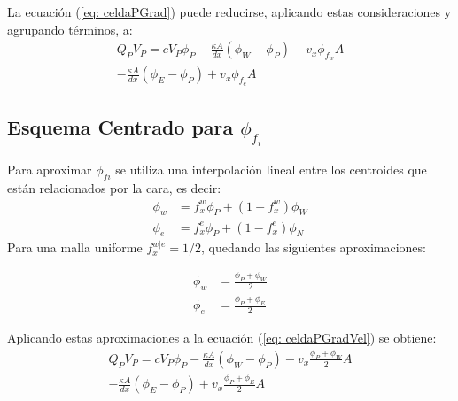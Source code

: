 \documentclass{article}
\begin{document}
    La ecuación (\ref{eq: celdaPGrad}) puede reducirse, aplicando estas consideraciones y agrupando términos, a:
    \begin{multline}
    	    Q_P V_P = c  V_P \phi_P - \frac{\kappa A}{dx} \left( \phi_W - \phi_P \right) - v_x \phi_{f_w} A \\
    	        - \frac{\kappa A}{dx} \left( \phi_E - \phi_P \right) + v_x \phi_{f_e} A
            \label{eq: celdaPGradVel}
    \end{multline}
    
            \subsection{Esquema Centrado para $\phi_{f_i}$} 
            
            Para aproximar $\phi_{fi}$ se utiliza una interpolación lineal entre los centroides que están relacionados por la cara, es decir:
            \begin{equation*}
                \begin{aligned}
                    \phi_w &= f_x^w \phi_P + (1 - f_x^w) \phi_W \\
                    \phi_e &= f_x^e \phi_P + (1 - f_x^e) \phi_N 
                \end{aligned}      
            \end{equation*} 
            Para una malla uniforme $f_x^{w|e} = 1/2$, quedando las siguientes aproximaciones:
            
            \begin{equation*}
                \begin{aligned}
                    \phi_w &= \frac{\phi_P +  \phi_W}{2} \\
                    \phi_e &= \frac{\phi_P +  \phi_E}{2}
            	\end{aligned}      
            \end{equation*}
            
            Aplicando estas aproximaciones a la ecuación (\ref{eq: celdaPGradVel}) se obtiene:
        \begin{multline}
    	    Q_P V_P = c  V_P \phi_P - \frac{\kappa A}{dx} \left( \phi_W - \phi_P \right) - v_x \frac{\phi_P +  \phi_W}{2} A \\ 
    	        - \frac{\kappa A}{dx} \left( \phi_E - \phi_P \right) + v_x \frac{\phi_P +  \phi_E}{2} A
    	        \label{eq: celdaPCentrado}
        \end{multline}
            
\end{document}
